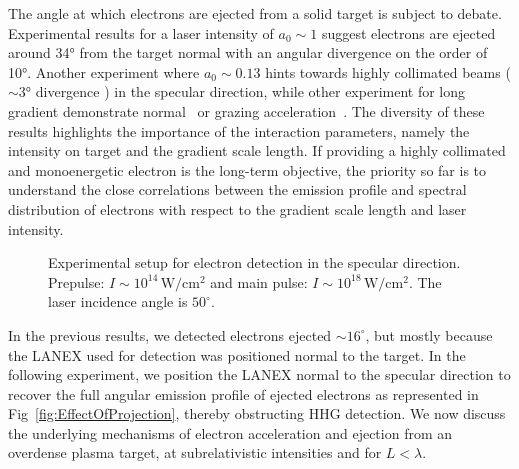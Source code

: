 %

The angle at which electrons are ejected from a solid target is subject to debate. Experimental results for a laser intensity of $a_0 \sim 1$ \cite{mordovanakis2009quasimonoenergetic} suggest electrons are ejected around 34° from the target normal with an angular divergence on the order of 10°. Another experiment where $a_0\sim0.13$ \cite{bastiani1997experimental} hints towards highly collimated beams ($\sim 3$° divergence ) in the specular direction, while other experiment for long gradient demonstrate  normal~\cite{li2001hot} or grazing acceleration~\cite{chen2006surface,li2006observation}. The diversity of these results highlights the importance of the  interaction parameters, namely the intensity on target and the gradient scale length. 
If providing a highly collimated and monoenergetic electron is the long-term objective, the priority so far is to understand the close correlations between the emission profile and spectral distribution of electrons with respect to the gradient scale length and laser intensity.\\



\begin{figure}[H]
\begin{center}
\caption{\label{fig:ElectronNormalSpecular}Experimental setup for electron detection in the specular direction. Prepulse: $I \sim 10^{14}\,\mathrm{W/cm^2}$ and main pulse: $I\sim 10^{18}\,\mathrm{W/cm^2}$. The laser incidence angle is $50^{\circ}$.} 
\end{center}
\end{figure}

\noindent In the previous results, we detected electrons ejected $\sim 16^{\circ}$, but mostly because the LANEX used for detection was positioned normal to the target. In the following experiment, we  position the LANEX normal to the specular direction to recover the full angular emission profile of ejected electrons as represented in Fig~\ref{fig:EffectOfProjection}, thereby obstructing HHG detection. We now discuss the underlying mechanisms of electron acceleration and ejection from an overdense plasma target, at subrelativistic intensities and for $L<\lambda$. \\


\\

